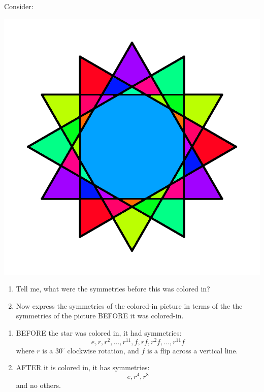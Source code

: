 \documentclass[noauthor,nooutcomes,12pt,hints]{ximera}
\begin{document}
\begin{question}
  Consider:
  \begin{center}
    \includegraphics[width=.6\textwidth]{qR3D12.png}
  \end{center}
  \begin{enumerate}
  \item Tell me, what were the symmetries before this was colored in?
  \item Now express the symmetries of the colored-in picture in terms
    of the the symmetries of the picture BEFORE it was colored-in.
  \end{enumerate}
  \begin{freeResponse}
    \begin{enumerate}
    \item BEFORE the star was colored in, it had symmetries:
      \[
      e,r,r^2,\dots,r^{11}, f, rf,r^2f, \dots, r^{11}f
      \]
      where $r$ is a $30^\circ$ clockwise rotation, and $f$ is a flip
      across a vertical line.
    \item AFTER it is colored in, it has symmetries:
      \[
      e, r^4, r^8
      \]
      and no others.
    \end{enumerate}
  \end{freeResponse}
\end{question}
\mynewpage
\end{document}
